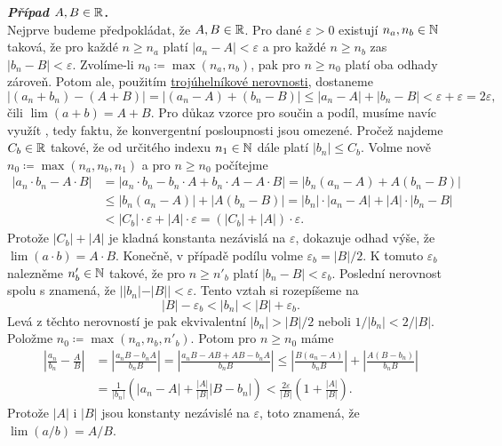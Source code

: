 \begin{thmproof}
 \textbf{\emph{Případ $A,B \in \mathbb{R}$}.}\\
 Nejprve budeme předpokládat, že $A,B \in \mathbb{R}$. Pro dané $\varepsilon>0$ existují
 $n_a,n_b \in \mathbb{N}$ taková, že pro každé $n \geq n_a$ platí $|a_n-A|<\varepsilon$
 a pro každé $n \geq n_b$ zas $|b_n-B|<\varepsilon$. Zvolíme-li $n_0 \coloneqq
 \max(n_a,n_b)$, pak pro $n \geq n_0$ platí oba odhady zároveň. Potom ale,
 použitím \hyperref[lem:trojuhelnikova-nerovnost]{trojúhelníkové nerovnosti},
 dostaneme
 \[
  |(a_n+b_n)-(A+B)| = |(a_n-A)+(b_n-B)| \leq |a_n-A| + |b_n-B| <
  \varepsilon+\varepsilon = 2\varepsilon,
 \]
 čili $\lim (a+b) = A+B$. Pro důkaz vzorce pro součin a podíl, musíme navíc
 využít , tedy faktu, že konvergentní
 posloupnosti jsou omezené. Pročež najdeme $C_b \in \mathbb{R}$ takové, že od určitého
 indexu $n_1 \in \mathbb{N}$ dále platí $|b_n| \leq C_b$. Volme nově $n_0 \coloneqq
 \max(n_a,n_b,n_1)$ a pro $n \geq n_0$ počítejme
 \begin{align*}
  |a_n \cdot b_n - A \cdot B| &= |a_n \cdot b_n - b_n \cdot A + b_n \cdot A -
  A \cdot B| = |b_n(a_n - A) + A(b_n - B)|\\
                              & \leq |b_n(a_n - A)| + |A(b_n-B)| = |b_n| \cdot
                              |a_n-A| + |A| \cdot |b_n-B| \\
                              &< |C_b| \cdot \varepsilon + |A| \cdot
                              \varepsilon = (|C_b| + |A|) \cdot \varepsilon.
 \end{align*}
 Protože $|C_b| + |A|$ je kladná konstanta nezávislá na $\varepsilon$, dokazuje
 odhad výše, že $\lim (a \cdot b) = A \cdot B$. Konečně, v případě podílu volme
 $\varepsilon_b = |B| / 2$. K tomuto $\varepsilon_b$ nalezněme $n'_b \in \mathbb{N}$
 takové, že pro $n \geq n'_b$ platí $|b_n - B| < \varepsilon_b$. Poslední
 nerovnost spolu s  znamená, že $|
 |b_n| - |B| | < \varepsilon$. Tento vztah si rozepíšeme na
 \[
  |B| - \varepsilon_b < |b_n| < |B| + \varepsilon_b.
 \]
 Levá z těchto nerovností je pak ekvivalentní $|b_n| > |B| / 2$ neboli $1 /
 |b_n| < 2 / |B|$. Položme $n_0 \coloneqq \max(n_a,n_b,n'_b)$. Potom pro $n \geq
 n_0$ máme
 \begin{align*}
  \left| \frac{a_n}{b_n} - \frac{A}{B} \right| &= \left| \frac{a_nB -
  b_nA}{b_nB} \right| = \left| \frac{a_nB - AB + AB - b_nA}{b_nB} \right| \leq
  \left| \frac{B(a_n-A)}{b_nB} \right| + \left| \frac{A(B - b_n)}{b_nB} \right|
  \\
                                               &= \frac{1}{|b_n|}\left(|a_n-A| +
                                               \frac{|A|}{|B|}|B-b_n| \right) <
                                               \frac{2\varepsilon}{|B|}\left(1 +
                                               \frac{|A|}{|B|}\right).
 \end{align*}
 Protože $|A|$ i $|B|$ jsou konstanty nezávislé na $\varepsilon$, toto znamená,
 že $\lim (a / b) = A / B$.


\end{thmproof}
